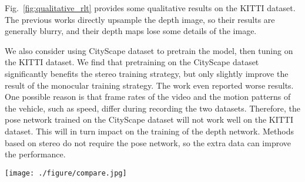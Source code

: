 \documentclass[10pt,twocolumn,letterpaper]{article}
\begin{document}
Fig.~\ref{fig:qualitative_rlt} provides some qualitative results on the KITTI dataset. The previous works directly upsample the depth image, so their results are generally blurry, and their depth maps lose some details of the image.  

We also consider using CityScape dataset \cite{cityscapes} to pretrain the model, then tuning on the KITTI dataset. We find that pretraining on the CityScape dataset significantly benefits the stereo training  strategy, but only slightly improve the result of the monocular training strategy. The work \cite{yin2018geonet} even reported worse results. One possible reason is that frame rates of the video and the motion patterns of the vehicle, such as speed, differ during recording the two datasets. Therefore, the pose network trained on the CityScape dataset will not work well on the KITTI dataset. This will in turn impact on the training of the depth network. Methods based on stereo do not require the pose network, so the extra data can improve the performance.

\begin{figure*}
	\centering
	\texttt{[image: ./figure/compare.jpg]}	
	\caption{Qualitative results on test images from the KITTI Eigen split.} 
	\label{fig:qualitative_rlt}
\end{figure*}
\end{document}
